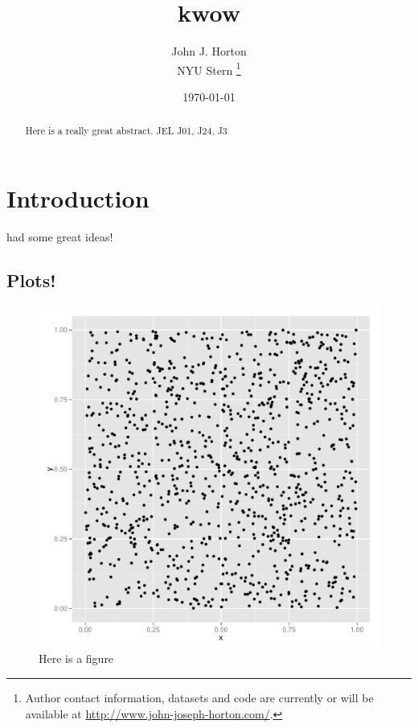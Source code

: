 \documentclass[11pt]{article}
\begin{document}
 

\title{ kwow }

\date{\today}

\author{ John J. Horton \\ NYU Stern \footnote{ Author contact information, datasets and code are currently or will be available at \href{http://www.john-joseph-horton.com/}{http://www.john-joseph-horton.com/}. } }
\maketitle

\begin{abstract}
\noindent  Here is a really great abstract.  \newline
\noindent JEL J01, J24, J3
\end{abstract} 

\section{Introduction}
\cite{smith1999wealth} had some great ideas! 

\subsection{Plots!}

\begin{figure}[h]
  \begin{center}
  \caption{Here is a figure} \label{fig:hist}
  \includegraphics[scale=0.25]{./plots/hist.pdf}
  \end{center} 
\end{figure}



\end{document}
